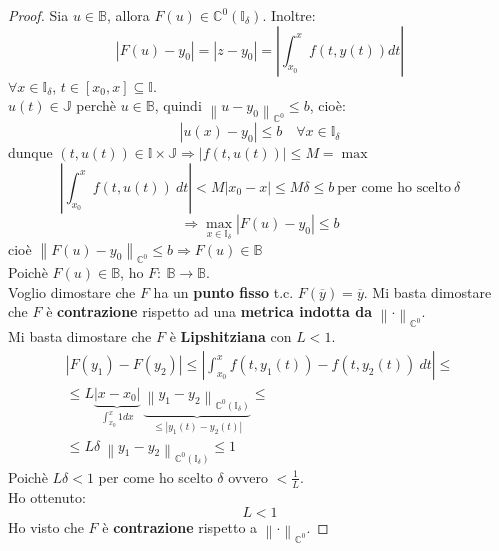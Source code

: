 \documentclass[a4paper, oneside]{article}
\newcommand\norma{\left\lVert\cdot\right\rVert}
\newcommand\C{\mathbb{C}}
\newcommand\B{\mathbb{B}}
\newcommand\I{\mathbb{I}}
\newcommand\J{\mathbb{J}}
\begin{document}
\begin{theorem}
\begin{proof}
        \noindent Sia $u\in\B$, allora $F(u)\in\C^0(\I_\delta)$. Inoltre:\\
        \[\left|F(u) - y_0\right| = \left|z-y_0\right| = \left|\int_{x_0}^{x} f\left(t,y(t)\right) dt\right|\]
        $\forall x\in\I_\delta$, $t\in[x_0,x]\subseteq\I$.\\
        $u(t)\in\J$ perchè $u\in\B$, quindi $\left\lVert u-y_0\right\rVert_{\C^0} \leq b$, cioè:
        \[\left|u(x) - y_0\right| \leq b \quad\forall x\in\I_\delta\]
        dunque $\left(t,u(t)\right)\in\I\times\J \Rightarrow \left|f\left(t,u(t)\right)\right|\leq M = \max$
        \[\left|\int_{x_0}^{x} f\left(t,u(t)\right) \ dt\right| < M \left|x_0-x\right| \leq M \delta \leq b \ \text{per come ho scelto} \ \delta\]
        \[\Rightarrow\max_{x\in\I_\delta} \left|F(u) - y_0\right| \leq b\]
        cioè $\left\lVert F(u) - y_0\right\rVert_{\C^0} \leq b \Rightarrow F(u)\in\B$\\

        \noindent Poichè $F(u)\in\B$, ho $F: \ \B\to\B$.\\

        \noindent Voglio dimostare che $F$ ha un \textbf{punto fisso} t.c. $F(\overline{y}) = \overline{y}$. 
        Mi basta dimostare che $F$ è \textbf{contrazione} rispetto ad una \textbf{metrica indotta da} $\norma_{\C^0}$.\\
        Mi basta dimostare che $F$ è \textbf{Lipshitziana} con $L<1$.
        \begin{gather*}
            \left|F(y_1) - F(y_2)\right| \leq \left|\int_{x_0}^{x} f\left(t,y_1(t)\right) - f\left(t,y_2(t)\right) \ dt\right| \leq\\
            \leq L \underbrace{|x-x_0|}_{\int_{x_0}^x 1 dx} \  \underbrace{\left\lVert y_1-y_2\right\rVert_{\C^0(\I_\delta)}}_{\leq |y_1(t)-y_2(t)|} \leq \\
            \leq L\delta \ \left\lVert y_1-y_2\right\rVert_{\C^0(\I_\delta)} \leq 1
        \end{gather*}
        Poichè $L\delta < 1$ per come ho scelto $\delta$ ovvero $< \frac{1}{L}$.\\ 
        Ho ottenuto:
        \[L<1\]
        Ho visto che $F$ è \textbf{contrazione} rispetto a $\norma_{\C^0}$.
        

\end{proof}
\end{theorem}
\end{document}
